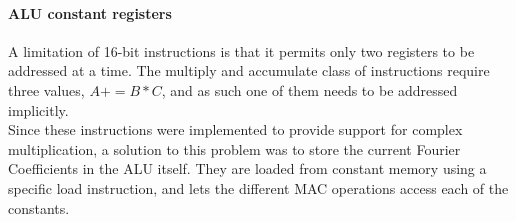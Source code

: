 %
%

\paragraph{ALU constant registers}
A limitation of 16-bit instructions is that it permits only two registers to be
addressed at a time. The multiply and accumulate class of instructions require
three values, $A += B*C$, and as such one of them needs to be addressed
implicitly.\\
Since these instructions were implemented to provide support for
complex multiplication, a solution to this problem was to store the current Fourier
Coefficients in the ALU itself. They are loaded from constant memory using a
specific load instruction, and lets the different MAC operations access each of
the constants.

